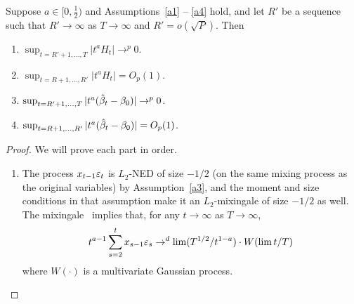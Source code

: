 \documentclass[12pt,fleqn]{article}
\begin{document}
\begin{alem}\label{res:a2}
  Suppose $a \in [0,\frac12)$ and Assumptions~\ref{a1} -- \ref{a4}
  hold, and let $R'$ be a sequence such that $R' \to \infty$ as $T \to
  \infty$ and $R' = o(\sqrt{P})$. Then
  \begin{enumerate}
  \item $\sup_{t=R'+1,\dots,T} | t^a H_t | \to^p 0$.
  \item $\sup_{t=R+1,\dots,R'} | t^a H_t | = O_p(1)$.
  \item $\sup_{t = R'+1,\dots,T} | t^a(\bh_t - \btrue) | \to^{p} 0$.
  \item $\sup_{t = R+1,\dots,R'} | t^a(\bh_t - \btrue) | = O_p(1)$.
  \end{enumerate}
\end{alem}

\begin{proof}
  We will prove each part in order.
  \begin{enumerate}
  \item The process $x_{t-1} \varepsilon_t$ is $L_2$-NED of size $-1/2$ (on
    the same mixing process as the original variables) by
    Assumption~\ref{a3}, and the moment and size conditions in that
    assumption make it an $L_2$-mixingale of size $-1/2$ as well. The
    mixingale \fclt\ implies that, for any $t \to \infty$ as $T \to \infty$,
    \begin{equation}\label{eq:2}
      t^{a - 1} \sum_{s=2}^t x_{s-1} \varepsilon_s \to^d \lim (T^{1/2} / t^{1-a}) \cdot W(\lim t/T)
    \end{equation}
    where $W(\cdot)$ is a multivariate Gaussian process.


\end{enumerate}
\end{proof}
\end{document}
